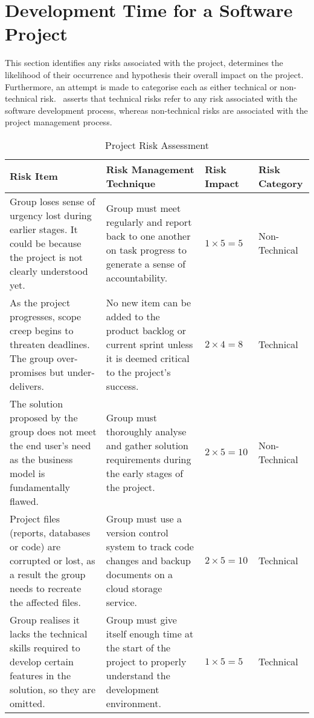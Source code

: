 \section{Development Time for a Software Project}

This section identifies any risks associated with the project, determines the likelihood of their occurrence and hypothesis their overall impact on the project. Furthermore, an attempt is made to categorise each as either technical or non-technical risk.~\parencite{dawson} asserts that technical risks refer to any risk associated with the software development process, whereas non-technical risks are associated with the project management process.

\begin{table}
  \caption[Project Risk Assessment]{Project Risk Assessment \hfill}
  \label{tab:runtime}
  \begin{tabular*}{14.0cm}{p{4.0cm}p{5.0cm}p{1.5cm}p{2cm}}
    \toprule
    Risk Item & Risk Management Technique & Risk Impact & Risk Category \\
    \midrule
    Group loses sense of urgency lost during earlier stages. It could be because the project is not clearly understood yet. & Group must meet regularly and report back to one another on task progress to generate a sense of accountability. & $1 \times 5 = 5$ & Non-Technical \\
    \addlinespace[0.5em]
    As the project progresses, scope creep begins to threaten deadlines. The group over-promises but under-delivers. & No new item can be added to the product backlog or current sprint unless it is deemed critical to the project’s success. & $2 \times 4 = 8$ & Technical \\
    \addlinespace[0.5em]
    The solution proposed by the group does not meet the end user’s need as the business model is fundamentally flawed. & Group must thoroughly analyse and gather solution requirements during the early stages of the project. & $2 \times 5 = 10$ & Non-Technical \\
    \addlinespace[0.5em]
    Project files (reports, databases or code) are corrupted or lost, as a result the group needs to recreate the affected files. & Group must use a version control system to track code changes and backup documents on a cloud storage service. & $2 \times 5 = 10$ & Technical \\
    \addlinespace[0.5em]
    Group realises it lacks the technical skills required to develop certain features in the solution, so they are omitted. & Group must give itself enough time at the start of the project to properly understand the development environment. & $1 \times 5 = 5$ & Technical \\

\end{tabular*}
\end{table}
